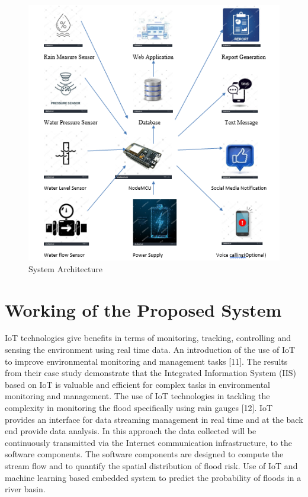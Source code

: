 \documentclass[a4paper,12pt]{report}
\begin{document}
\begin{itemize}
\begin{figure}[H]
  \includegraphics[width=6.5 in]{d1.png}
  \caption{System Architecture}
  \label{fig:boat1}
\end{figure}

\section{Working of the Proposed System}
IoT technologies give benefits in terms of monitoring, tracking, controlling and sensing the environment using real time data. An introduction of the use of IoT to improve environmental monitoring and management tasks [11]. The results from their case study demonstrate that the Integrated Information System (IIS) based on IoT is valuable and efficient for complex tasks in environmental monitoring and management. The use of IoT technologies in tackling the complexity in monitoring the flood specifically using rain gauges [12]. IoT provides an interface for data streaming management in real time and at the back end provide data analysis. In this approach the data collected will be continuously transmitted via the Internet communication infrastructure, to the software components. The software components are designed to compute the stream flow and to quantify the spatial distribution of flood risk. Use of IoT and machine learning based embedded system to predict the probability of floods in a river basin.\\


\end{itemize}
\end{document}
